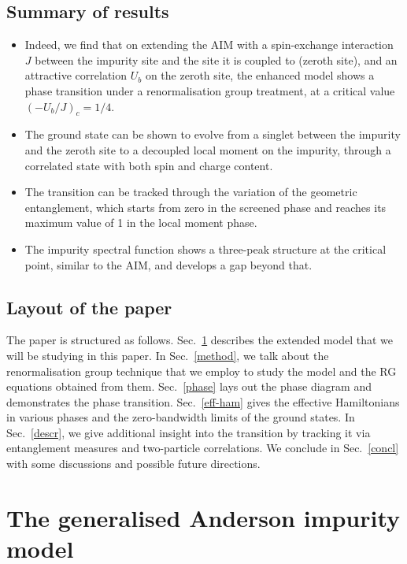 \documentclass[reprint,superscriptaddress,floatfix]{revtex4-2}
\begin{document}
\subsection*{Summary of results}

\begin{itemize}
	\item {\color{blue}Indeed}, we find that on extending the AIM with a spin-exchange interaction \(J\) between the impurity site and the site it is coupled to (zeroth site), and an attractive correlation \(U_b\) on the zeroth site, the enhanced model shows a phase transition under a renormalisation group treatment, at a critical value \(\left(-U_b/J\right)_c=1/4\). 
	\item The ground state can be shown to evolve from a singlet between the impurity and the zeroth site to a decoupled local moment on the impurity, through a correlated state with both spin and charge content.
	\item The transition can be tracked through the variation of the geometric entanglement, which starts from zero in the screened phase and reaches its maximum value of 1 in the local moment phase.
	\item The impurity spectral function shows a three-peak structure at the critical point, similar to the AIM, and develops a gap beyond that.
\end{itemize}
 
\subsection*{Layout of the {\color{blue}paper}}

The paper is structured as follows. Sec.~\ref{def-ham} describes the extended model that we will be studying in this {\color{blue}paper}. In Sec.~\ref{method}, we talk about the renormalisation group technique that we employ to study the model and the RG equations obtained from them. Sec.~\ref{phase} lays out the phase diagram and demonstrates the phase transition. Sec.~\ref{eff-ham} gives the effective Hamiltonians in various phases and the zero-bandwidth limits of the ground states. In Sec.~\ref{descr}, we give additional insight into the transition by tracking it via entanglement measures and two-particle correlations. We conclude in Sec.~\ref{concl} with some discussions and possible future directions.


\section{The generalised Anderson impurity model}
\label{def-ham}
\end{document}
